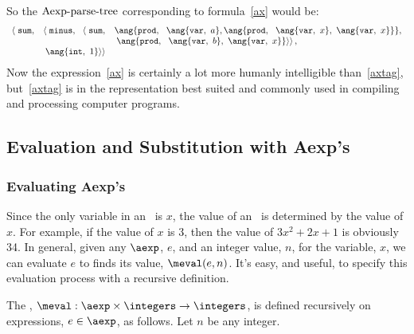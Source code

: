 \begin{definition}
\begin{staffnotes}
So the $\text{Aexp-parse-tree}$ corresponding to formula~\ref{ax} would be:
\begin{equation}\label{axtag}
\begin{array}{rll}
\left< \right. \texttt{sum}, 
         & \left< \right. \texttt{minus},\ \ \left< \right. \texttt{sum},
               & \ang{\texttt{prod},\ \ \ang{\texttt{var},\ a},
                                     \ang{\texttt{prod},\ \
                                            \ang{\texttt{var},\ x},\
                                            \ang{\texttt{var},\ x}}},\\
                               && \left. \left. \ang{\texttt{prod},\ \
                                       \ang{\texttt{var},\ b},\
                                       \ang{\texttt{var},\ x}}
                                   \right> \right>,\\
         & \left. \left. \ang{\texttt{int},\ 1} \right> \right>
\end{array}
\end{equation}
Now the expression~\ref{ax} is certainly a lot more humanly
intelligible than~\ref{axtag}, but~\ref{axtag} is in the
representation best suited and commonly used in compiling and
processing computer programs.

\end{staffnotes}


\subsection{Evaluation and Substitution with Aexp's}

\subsubsection{Evaluating Aexp's}

Since the only variable in an \aexp\ is $x$, the value of an \aexp\ is
determined by the value of $x$.  For example, if the value of $x$ is 3,
then the value of $3x^2 + 2x + 1$ is obviously 34.  In general, given any
$\aexp$, $e$, and an integer value, $n$, for the variable, $x$, we can
evaluate $e$ to finds its value, $\meval(e,n)$.  It's easy, and useful, to
specify this evaluation process with a recursive definition.

\begin{definition}\label{meval-def}
  The \term{evaluation function}, $\meval: \aexp \times \integers \to
  \integers$, is defined recursively on expressions, $e \in \aexp$, as
  follows.  Let $n$ be any integer.


\end{definition}
\end{definition}
